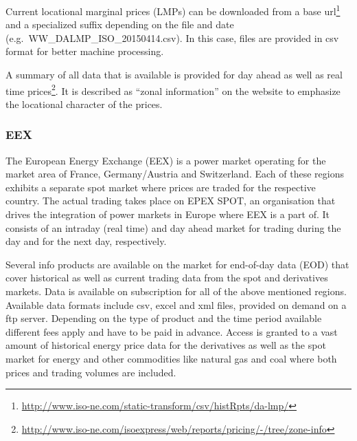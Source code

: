Current locational marginal prices (LMPs) can be downloaded from a base url\footnote{\url{http://www.iso-ne.com/static-transform/csv/histRpts/da-lmp/}} and a specialized suffix depending on the file and date (e.g.~WW\_DALMP\_ISO\_20150414.csv). In this case, files are provided in csv format for better machine processing. 


A summary of all data that is available is provided for day ahead as well as real time prices\footnote{\url{http://www.iso-ne.com/isoexpress/web/reports/pricing/-/tree/zone-info}}. It is described as ``zonal information'' on the website to emphasize the locational character of the prices. 


\subsubsection{EEX}

The European Energy Exchange (EEX) is a power market operating for the market area of France, Germany/Austria and Switzerland. Each of these regions exhibits a separate spot market where prices are traded for the respective country. 
The actual trading takes place on EPEX SPOT, an organisation that drives the integration of power markets in Europe where EEX is a part of. It consists of an intraday (real time) and day ahead market for trading during the day and for the next day, respectively. 

Several info products are available on the market for end-of-day data (EOD) that cover historical as well as current trading data from the spot and derivatives markets. 
Data is available on subscription for all of the above mentioned regions. Available data formats include csv, excel and xml files, provided on demand on a ftp server. 
Depending on the type of product and the time period available different fees apply and have to be paid in advance. 
Access is granted to a vast amount of historical energy price data for the derivatives as well as the spot market for energy and other commodities like natural gas and coal where both prices and trading volumes are included. 

